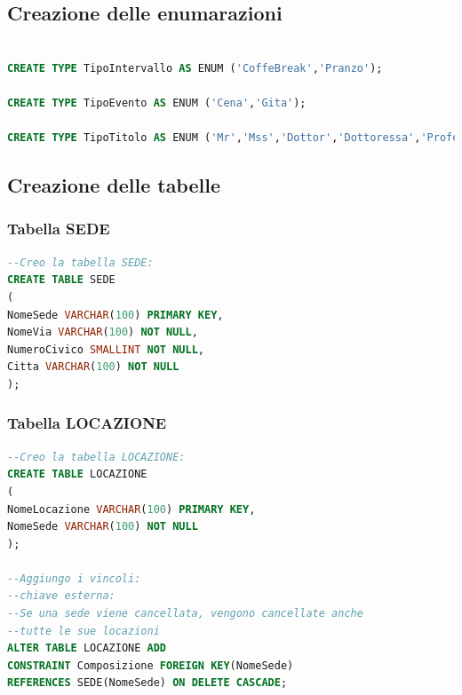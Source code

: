 \documentclass[a4page]{article}
\begin{document}
\subsection{Creazione delle enumarazioni}
\begin{lstlisting}[language=SQL,
        deletekeywords={IDENTITY,INT},
        morekeywords={clustered},    
        framesep=10pt,
        framextopmargin=10pt]
        
CREATE TYPE TipoIntervallo AS ENUM ('CoffeBreak','Pranzo');

CREATE TYPE TipoEvento AS ENUM ('Cena','Gita');

CREATE TYPE TipoTitolo AS ENUM ('Mr','Mss','Dottor','Dottoressa','Professor','Professoressa');
\end{lstlisting}
\subsection{Creazione delle tabelle}
\subsubsection{Tabella SEDE}
\begin{lstlisting}[language=SQL,
        deletekeywords={IDENTITY,INT},
        morekeywords={clustered},    
        framesep=10pt,
        framextopmargin=10pt]
--Creo la tabella SEDE: 
CREATE TABLE SEDE
(
NomeSede VARCHAR(100) PRIMARY KEY,
NomeVia	VARCHAR(100) NOT NULL,
NumeroCivico SMALLINT NOT NULL,
Citta VARCHAR(100) NOT NULL
);       

\end{lstlisting}
\subsubsection{Tabella LOCAZIONE}
\begin{lstlisting}[language=SQL,
        deletekeywords={IDENTITY,INT},
        morekeywords={clustered},    
        framesep=10pt,
        framextopmargin=10pt]
--Creo la tabella LOCAZIONE: 
CREATE TABLE LOCAZIONE
(
NomeLocazione VARCHAR(100) PRIMARY KEY,
NomeSede VARCHAR(100) NOT NULL
);

--Aggiungo i vincoli:
--chiave esterna:
--Se una sede viene cancellata, vengono cancellate anche
--tutte le sue locazioni
ALTER TABLE LOCAZIONE ADD
CONSTRAINT Composizione FOREIGN KEY(NomeSede)
REFERENCES SEDE(NomeSede) ON DELETE CASCADE;       

\end{lstlisting}
\end{document}
